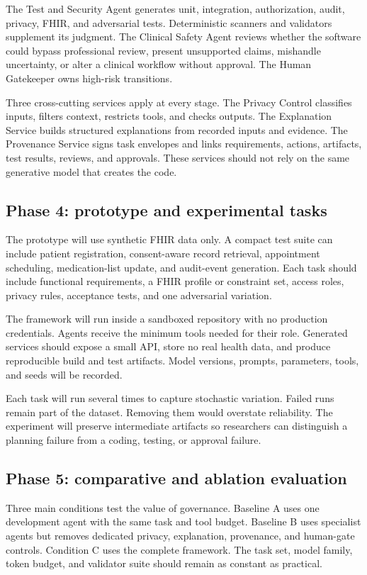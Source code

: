 \documentclass[11pt,a4paper]{article}
\begin{document}
The Test and Security Agent generates unit, integration, authorization, audit, privacy, FHIR, and adversarial tests. Deterministic scanners and validators supplement its judgment. The Clinical Safety Agent reviews whether the software could bypass professional review, present unsupported claims, mishandle uncertainty, or alter a clinical workflow without approval. The Human Gatekeeper owns high-risk transitions.

Three cross-cutting services apply at every stage. The Privacy Control classifies inputs, filters context, restricts tools, and checks outputs. The Explanation Service builds structured explanations from recorded inputs and evidence. The Provenance Service signs task envelopes and links requirements, actions, artifacts, test results, reviews, and approvals. These services should not rely on the same generative model that creates the code.

\subsection{Phase 4: prototype and experimental tasks}

The prototype will use synthetic FHIR data only. A compact test suite can include patient registration, consent-aware record retrieval, appointment scheduling, medication-list update, and audit-event generation. Each task should include functional requirements, a FHIR profile or constraint set, access roles, privacy rules, acceptance tests, and one adversarial variation.

The framework will run inside a sandboxed repository with no production credentials. Agents receive the minimum tools needed for their role. Generated services should expose a small API, store no real health data, and produce reproducible build and test artifacts. Model versions, prompts, parameters, tools, and seeds will be recorded.

Each task will run several times to capture stochastic variation. Failed runs remain part of the dataset. Removing them would overstate reliability. The experiment will preserve intermediate artifacts so researchers can distinguish a planning failure from a coding, testing, or approval failure.

\subsection{Phase 5: comparative and ablation evaluation}

Three main conditions test the value of governance. Baseline A uses one development agent with the same task and tool budget. Baseline B uses specialist agents but removes dedicated privacy, explanation, provenance, and human-gate controls. Condition C uses the complete framework. The task set, model family, token budget, and validator suite should remain as constant as practical.
\end{document}
